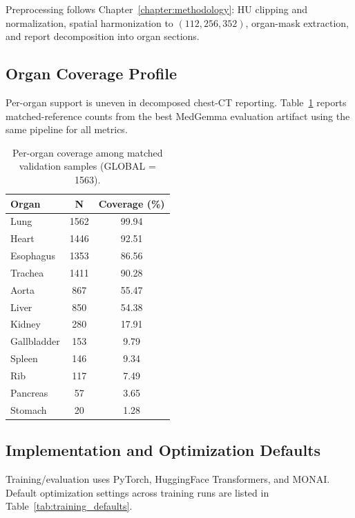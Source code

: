 Preprocessing follows Chapter~\ref{chapter:methodology}: HU clipping and normalization, spatial harmonization to $(112,256,352)$, organ-mask extraction, and report decomposition into organ sections.

\subsection{Organ Coverage Profile}
Per-organ support is uneven in decomposed chest-CT reporting. Table~\ref{tab:organ_coverage_eval} reports matched-reference counts from the best MedGemma evaluation artifact using the same pipeline for all metrics.

\begin{table}[htbp]
    \centering
    \caption{Per-organ coverage among matched validation samples (GLOBAL = 1563).}
    \label{tab:organ_coverage_eval}
    \begin{tabular}{lcc}
        \toprule
        \textbf{Organ} & \textbf{N} & \textbf{Coverage (\%)} \\\midrule
        Lung & 1562 & 99.94 \\
        Heart & 1446 & 92.51 \\
        Esophagus & 1353 & 86.56 \\
        Trachea & 1411 & 90.28 \\
        Aorta & 867 & 55.47 \\
        Liver & 850 & 54.38 \\
        Kidney & 280 & 17.91 \\
        Gallbladder & 153 & 9.79 \\
        Spleen & 146 & 9.34 \\
        Rib & 117 & 7.49 \\
        Pancreas & 57 & 3.65 \\
        Stomach & 20 & 1.28 \\
        \bottomrule
    \end{tabular}
\end{table}

\subsection{Implementation and Optimization Defaults}
Training/evaluation uses PyTorch, HuggingFace Transformers, and \ac{MONAI}. Default optimization settings across training runs are listed in Table~\ref{tab:training_defaults}.

